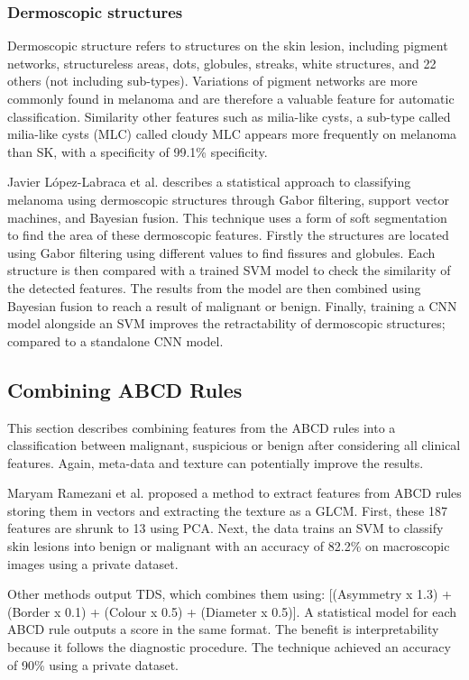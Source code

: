 \subsubsection{Dermoscopic structures}
Dermoscopic structure refers to structures on the skin lesion, including pigment networks, structureless areas, dots, globules, streaks, white structures, and 22 others (not including sub-types). Variations of pigment networks are more commonly found in melanoma\cite{Anantha04} and are therefore a valuable feature for automatic classification. Similarity other features such as milia-like cysts, a sub-type called milia-like cysts (MLC) called cloudy MLC appears more frequently on melanoma than SK, with a specificity of  99.1\% specificity\cite{Stricklin2011}.

Javier López-Labraca et al.\cite{Lopez-Labraca2018} describes a statistical approach to classifying melanoma using dermoscopic structures through Gabor filtering, support vector machines, and Bayesian fusion. This technique uses a form of soft segmentation to find the area of these dermoscopic features. Firstly the structures are located using Gabor filtering using different values to find fissures and globules. Each structure is then compared with a trained SVM model to check the similarity of the detected features. The results from the model are then combined using Bayesian fusion to reach a result of malignant or benign. Finally, training a CNN model alongside an SVM improves the retractability of dermoscopic structures; compared to a standalone CNN model.

\subsection{Combining ABCD Rules}
This section describes combining features from the ABCD rules into a classification between malignant, suspicious or benign after considering all clinical features. Again, meta-data and texture can potentially improve the results.

Maryam Ramezani et al. proposed a method to extract features from ABCD rules storing them in vectors and extracting the texture as a GLCM. First, these 187 features are shrunk to 13 using PCA\cite{Ramezani2014}. Next, the data trains an SVM to classify skin lesions into benign or malignant with an accuracy of 82.2\% on macroscopic images using a private dataset.

Other methods output TDS\cite{Zaqout2016, Zhang2018}, which combines them using: [(Asymmetry x 1.3) + (Border x 0.1) + (Colour x 0.5) + (Diameter x 0.5)]. A statistical model for each ABCD rule outputs a score in the same format. The benefit is interpretability because it follows the diagnostic procedure. The technique achieved an accuracy of 90\% using a private dataset.

